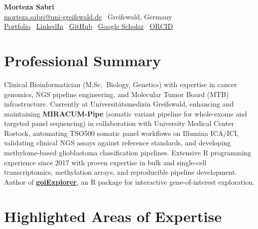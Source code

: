 \documentclass[10pt, a4paper]{article}
\begin{document}
\begin{center}
  {\LARGE\bfseries Morteza Sabri}\\[3pt]
  \href{mailto:morteza.sabri@uni-greifswald.de}{morteza.sabri@uni-greifswald.de}
  \textbar\ Greifswald, Germany \\[1pt]
  \href{https://mortezasabri.github.io}{Portfolio}
  \textbar\ \href{https://www.linkedin.com/in/mortezasabri}{LinkedIn}
  \textbar\ \href{https://github.com/mortezasabri}{GitHub}
  \textbar\ \href{https://scholar.google.at/citations?user=KuzkDTcAAAAJ}{Google Scholar}
  \textbar\ \href{https://orcid.org/0000-0001-6662-5984}{ORCID}
\end{center}

\vspace{1pt}

\section{Professional Summary}

Clinical Bioinformatician (M.Sc.\ Biology, Genetics) with expertise in cancer genomics, NGS pipeline
engineering, and Molecular Tumor Board (MTB) infrastructure. Currently at Universit\"atsmedizin
Greifswald, enhancing and maintaining \textbf{MIRACUM-Pipe} (somatic variant pipeline for whole-exome
and targeted panel sequencing) in collaboration with University Medical Center Rostock, automating
TSO500 somatic panel workflows on Illumina ICA/ICI, validating clinical NGS assays against reference
standards, and developing methylome-based glioblastoma classification pipelines. Extensive R
programming experience since 2017 with proven expertise in bulk and single-cell transcriptomics,
methylation arrays, and reproducible pipeline development. Author of
\href{https://github.com/mortezasabri/goiExplorer}{\textbf{goiExplorer}}, an R package for interactive
gene-of-interest exploration.

\section{Highlighted Areas of Expertise}
\end{document}
